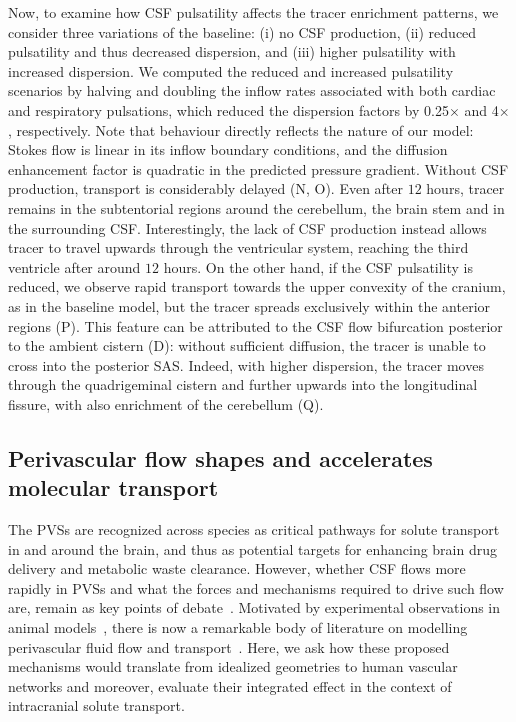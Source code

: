 \documentclass[fleqn,10pt]{wlscirep}
\begin{document}
Now, to examine how CSF pulsatility affects the tracer enrichment patterns,
we consider three variations of the baseline: (i) no CSF production,
(ii) reduced pulsatility and thus decreased dispersion, and (iii) higher pulsatility with increased dispersion. We computed the reduced and increased pulsatility scenarios by halving and doubling the inflow rates associated with both cardiac and respiratory pulsations, which reduced the dispersion factors by 0.25$\times$ and 4$\times$, respectively. Note that behaviour directly reflects the nature of our model: Stokes flow is linear in its inflow boundary conditions, and the diffusion enhancement factor is quadratic in the predicted pressure gradient.
Without CSF production, transport is considerably delayed
(N, O). Even after $12$ hours, tracer remains in the
subtentorial regions around the cerebellum, the brain stem and in the
surrounding CSF. Interestingly, the lack of CSF production instead
allows tracer to travel upwards through the ventricular system,
reaching the third ventricle after around $12$ hours. On the other
hand, if the CSF pulsatility is reduced, we observe rapid transport
towards the upper convexity of the cranium, as in the baseline model,
but the tracer spreads exclusively within the anterior regions
(P). This feature can be attributed to the CSF flow
bifurcation posterior to the ambient cistern (D):
without sufficient diffusion, the tracer is unable to cross into the
posterior SAS. Indeed, with higher dispersion, the tracer moves
through the quadrigeminal cistern and further upwards into the
longitudinal fissure, with also enrichment of the cerebellum
(Q).

\subsection*{Perivascular flow shapes and accelerates molecular transport}
\label{sec:pvs_flow_results}

The PVSs are recognized across species as critical pathways for solute
transport in and around the brain, and thus as potential targets for
enhancing brain drug delivery and metabolic waste clearance. However,
whether CSF flows more rapidly in PVSs and what the forces and
mechanisms required to drive such flow are, remain as key points of
debate~\cite{bohr2022glymphatic, van2024caa}. Motivated by
experimental observations in animal
models~\cite{iliff2012paravascular, iliff2013cerebral, mestre2018flow,
  bedussi2018paravascular}, there is now a remarkable body of
literature on modelling perivascular fluid flow and
transport~\cite{bilston2003arterial, asgari2016glymphatic,
  rey2018pulsatile, daversin2020mechanisms, sharp2019dispersion,
  thomas2019fluid, kedarasetti2020functional, kedarasetti2020arterial,
  troyetsky2021dispersion, martinac2021phase, gjerde2023directional,
  nozaleda2024arterial}. Here, we ask how these proposed mechanisms
would translate from idealized geometries to human vascular networks
and moreover, evaluate their integrated effect in the context of
intracranial solute transport.
\end{document}

